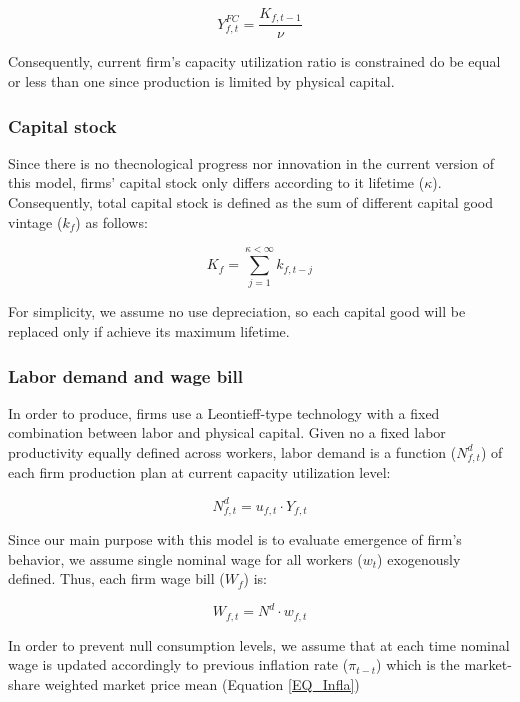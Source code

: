 \documentclass{SelfArx}
\begin{document}
\begin{latex}
\begin{equation}
Y_{f,t}^{FC} = \frac{K_{f,t-1}}{\nu}
\end{equation}
\end{latex}
Consequently, current firm's capacity utilization ratio is constrained do be equal or less than one since production is limited by physical capital.



\subsubsection*{Capital stock}
\label{sec:orgdc32565}


Since there is no thecnological progress nor innovation in the current version of this model, firms' capital stock only differs according to it lifetime (\(\kappa\)).
Consequently, total capital stock is defined as the sum of different capital good vintage (\(k_{f}\)) as follows:

\begin{latex}
\begin{equation}
K_{f} = \sum_{j=1}^{\kappa < \infty} k_{f,t-j}
\end{equation}
\end{latex}
For simplicity, we assume no use depreciation, so each capital good will be replaced only if achieve its maximum lifetime.

\subsubsection*{Labor demand and wage bill}
\label{sec:orge901aab}

In order to produce, firms use a Leontieff-type technology with a fixed combination between labor and physical capital.
Given no a fixed labor productivity equally defined across workers, labor demand is a function (\(N^{d}_{f,t}\)) of each firm production plan at current capacity utilization level:

\begin{latex}
\begin{equation}
N^{d}_{f,t} = u_{f,t}\cdot Y_{f,t}
\end{equation}
\end{latex}

Since our main purpose with this model is to evaluate emergence of firm's behavior, we assume single nominal wage for all workers (\(w_{t}\)) exogenously defined.
Thus, each firm wage bill (\(W_{f}\)) is:
\begin{latex}
\begin{equation}
W_{f,t} = N^{d}\cdot w_{f,t}
\end{equation}
\end{latex}
In order to prevent null consumption levels, we assume that at each time nominal wage is updated accordingly to previous inflation rate (\(\pi_{t-t}\)) which is the market-share weighted market price mean (Equation \ref{EQ_Infla})
\end{document}
